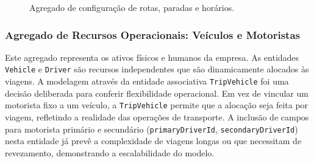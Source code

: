 \begin{figure}[H]
  \caption{Agregado de configuração de rotas, paradas e horários.}
\end{figure}

\subsubsection*{Agregado de Recursos Operacionais: Veículos e Motoristas}

Este agregado representa os ativos físicos e humanos da empresa. As entidades \texttt{Vehicle} e \texttt{Driver} são recursos independentes que são dinamicamente alocados às viagens. A modelagem através da entidade associativa \texttt{TripVehicle} foi uma decisão deliberada para conferir flexibilidade operacional. Em vez de vincular um motorista fixo a um veículo, a \texttt{TripVehicle} permite que a alocação seja feita por viagem, refletindo a realidade das operações de transporte. A inclusão de campos para motorista primário e secundário (\texttt{primaryDriverId}, \texttt{secondaryDriverId}) nesta entidade já prevê a complexidade de viagens longas ou que necessitam de revezamento, demonstrando a escalabilidade do modelo.


